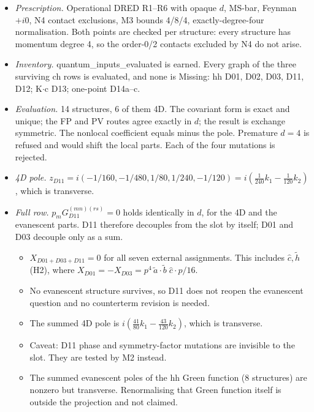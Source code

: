 \begin{itemize}
\item \emph{Prescription.} Operational DRED R1--R6 with opaque $d$, MS-bar, Feynman $+i0$, N4 contact exclusions,
  M3 bounds 4/8/4, exactly-degree-four normalisation. Both points are checked per structure: every structure has
  momentum degree 4, so the order-0/2 contacts excluded by N4 do not arise.
\item \emph{Inventory.} quantum\_inputs\_evaluated is earned. Every graph of the three surviving ch rows is evaluated,
  and none is Missing: hh D01, D02, D03, D11, D12; K$\cdot$c D13; one-point D14a--c.
\item \emph{Evaluation.} 14 structures, 6 of them 4D. The covariant form is exact and unique; the FP and PV routes
  agree exactly in $d$; the result is exchange symmetric. The nonlocal coefficient equals minus the pole. Premature
  $d=4$ is refused and would shift the local parts. Each of the four mutations is rejected.
\item \emph{4D pole.} $z_{D11}=i(-1/160,-1/480,1/80,1/240,-1/120)=i(\tfrac1{240}k_1-\tfrac1{120}k_2)$, which is
  transverse.
\item \emph{Full row.} $p_m G_{D11}^{(mn)(rs)}=0$ holds identically in $d$, for the 4D and the evanescent parts.
  D11 therefore decouples from the slot by itself; D01 and D03 decouple only as a sum.
  \begin{itemize}
  \item $X_{D01+D03+D11}=0$ for all seven external assignments. This includes $\hat c,\tilde h$ (H2), where
    $X_{D01}=-X_{D03}=p^4\,\tilde a\!\cdot\!\tilde b\;\hat c\!\cdot\!p/16$.
  \item No evanescent structure survives, so D11 does not reopen the evanescent question and no counterterm
    revision is needed.
  \item The summed 4D pole is $i(\tfrac{41}{80}k_1-\tfrac{43}{120}k_2)$, which is transverse.
  \item Caveat: D11 phase and symmetry-factor mutations are invisible to the slot. They are tested by M2 instead.
  \item The summed evanescent poles of the hh Green function (8 structures) are nonzero but transverse.
    Renormalising that Green function itself is outside the projection and not claimed.
  \end{itemize}
\end{itemize}


